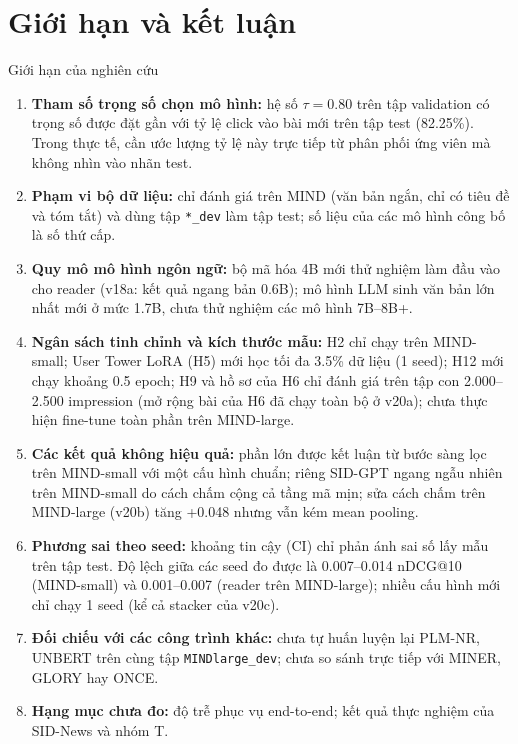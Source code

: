 \documentclass[aspectratio=169,t]{beamer}
\newcommand{\code}[1]{\texttt{#1}}
\begin{document}
\section{Giới hạn và kết luận}
\begin{frame}[shrink]{Giới hạn của nghiên cứu}
\scriptsize
\begin{enumerate}
  \setlength{\itemsep}{3pt}
  \item \textbf{Tham số trọng số chọn mô hình:} hệ số $\tau=0.80$ trên tập validation có trọng số được đặt gần với tỷ lệ click vào bài mới trên tập test (82.25\%). Trong thực tế, cần ước lượng tỷ lệ này trực tiếp từ phân phối ứng viên mà không nhìn vào nhãn test.
  \item \textbf{Phạm vi bộ dữ liệu:} chỉ đánh giá trên MIND (văn bản ngắn, chỉ có tiêu đề và tóm tắt) và dùng tập \code{*\_dev} làm tập test; số liệu của các mô hình công bố là số thứ cấp.
  \item \textbf{Quy mô mô hình ngôn ngữ:} bộ mã hóa 4B mới thử nghiệm làm đầu vào cho reader (v18a: kết quả ngang bản 0.6B); mô hình LLM sinh văn bản lớn nhất mới ở mức 1.7B, chưa thử nghiệm các mô hình 7B--8B+.
  \item \textbf{Ngân sách tinh chỉnh và kích thước mẫu:} H2 chỉ chạy trên MIND-small; User Tower LoRA (H5) mới học tối đa 3.5\% dữ liệu (1 seed); H12 mới chạy khoảng 0.5 epoch; H9 và hồ sơ của H6 chỉ đánh giá trên tập con 2.000--2.500 impression (mở rộng bài của H6 đã chạy toàn bộ ở v20a); chưa thực hiện fine-tune toàn phần trên MIND-large.
  \item \textbf{Các kết quả không hiệu quả:} phần lớn được kết luận từ bước sàng lọc trên MIND-small với một cấu hình chuẩn; riêng SID-GPT ngang ngẫu nhiên trên MIND-small do cách chấm cộng cả tầng mã mịn; sửa cách chấm trên MIND-large (v20b) tăng +0.048 nhưng vẫn kém mean pooling.
  \item \textbf{Phương sai theo seed:} khoảng tin cậy (CI) chỉ phản ánh sai số lấy mẫu trên tập test. Độ lệch giữa các seed đo được là 0.007--0.014 nDCG@10 (MIND-small) và 0.001--0.007 (reader trên MIND-large); nhiều cấu hình mới chỉ chạy 1 seed (kể cả stacker của v20c).
  \item \textbf{Đối chiếu với các công trình khác:} chưa tự huấn luyện lại PLM-NR, UNBERT trên cùng tập \code{MINDlarge\_dev}; chưa so sánh trực tiếp với MINER, GLORY hay ONCE.
  \item \textbf{Hạng mục chưa đo:} độ trễ phục vụ end-to-end; kết quả thực nghiệm của SID-News và nhóm T.
\end{enumerate}
\par\kern0pt%
\end{frame}
\end{document}
